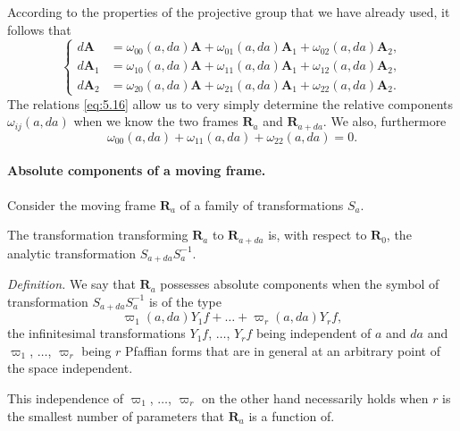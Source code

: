 \documentclass[leqno,11pt]{book}
\numberwithin{equation}{chapter}
\theoremstyle{shape1}
\theoremstyle{shapesmall}
\newcommand{\vp}{\varpi}
\newcommand{\somespace}{\vspace{9pt}}
\begin{document}
According to the properties of the projective group that we have already used, it follows that
\begin{equation}
  \label{eq:5.16}
  \left\{
    \begin{aligned}
  d\mathbf{A}_{\phantom{0}}&=\omega_{00}(a,da)\mathbf{A}+\omega_{01}(a,da)\mathbf{A}_{1}+\omega_{02}(a,da)\mathbf{A}_{2},\\
  d\mathbf{A}_{{1}}&=\omega_{10}(a,da)\mathbf{A}+\omega_{11}(a,da)\mathbf{A}_{1}+\omega_{12}(a,da)\mathbf{A}_{2},\\
  d\mathbf{A}_{{2}}&=\omega_{20}(a,da)\mathbf{A}+\omega_{21}(a,da)\mathbf{A}_{1}+\omega_{22}(a,da)\mathbf{A}_{2}.      
    \end{aligned}
  \right.
\end{equation}
The relations \eqref{eq:5.16} allow us to very simply determine the relative components $\omega_{ij}(a,da)$ when we know the two frames $\mathbf{R}_{a}$ and $\mathbf{R}_{a+da}$. We also, furthermore
\begin{equation}
  \label{eq:5.17}
  \omega_{00}(a,da)+\omega_{11}(a,da)+\omega_{22}(a,da)=0.
\end{equation}


\paragraph{Absolute components of a moving frame.}
\label{sec:74}
Consider the moving frame $\mathbf{R}_{a}$ of a family of transformations $S_{a}$.

The transformation transforming $\mathbf{R}_{a}$ to $\mathbf{R}_{a+da}$ is, with respect to $\mathbf{R}_{0}$, the analytic transformation $S_{a+da}S_{a}^{-1}$.

\somespace

\emph{Definition.} We say that $\mathbf{R}_{a}$ possesses absolute components when the symbol of transformation $S_{a+da}S_{a}^{-1}$ is of the type
\begin{equation}
  \label{eq:5.18}
  \vp_{1}(a,da)Y_{1}f+\dots+\vp_{r}(a,da)Y_{r}f,
\end{equation}
the infinitesimal transformations $Y_{1}f$, $\dots$, $Y_{r}f$ being independent of $a$ and $da$ and $\vp_{1}$, $\dots$, $\vp_{r}$ being $r$ Pfaffian forms that are in general at an arbitrary point of the space independent.

This independence of $\vp_{1}$, $\dots$, $\vp_{r}$ on the other hand necessarily holds when $r$ is the smallest number of parameters that $\mathbf{R}_{a}$ is a function of.
\end{document}
